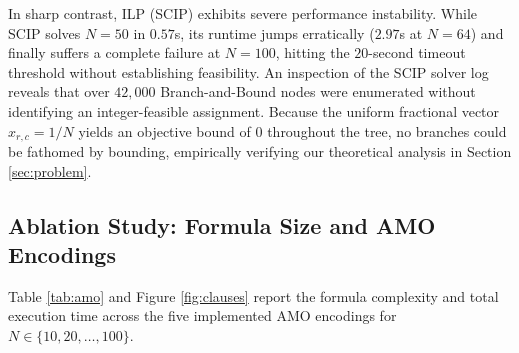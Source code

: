 \documentclass[a4paper,fleqn]{cas-sc}
\begin{document}
In sharp contrast, ILP (SCIP) exhibits severe performance instability. While SCIP solves $N=50$ in $0.57$s, its runtime jumps erratically ($2.97$s at $N=64$) and finally suffers a complete failure at $N=100$, hitting the $20$-second timeout threshold without establishing feasibility. An inspection of the SCIP solver log reveals that over $42,000$ Branch-and-Bound nodes were enumerated without identifying an integer-feasible assignment. Because the uniform fractional vector $x_{r,c} = 1/N$ yields an objective bound of $0$ throughout the tree, no branches could be fathomed by bounding, empirically verifying our theoretical analysis in Section \ref{sec:problem}.

\subsection{Ablation Study: Formula Size and AMO Encodings}
Table \ref{tab:amo} and Figure \ref{fig:clauses} report the formula complexity and total execution time across the five implemented AMO encodings for $N \in \{10, 20, \dots, 100\}$.
\end{document}
